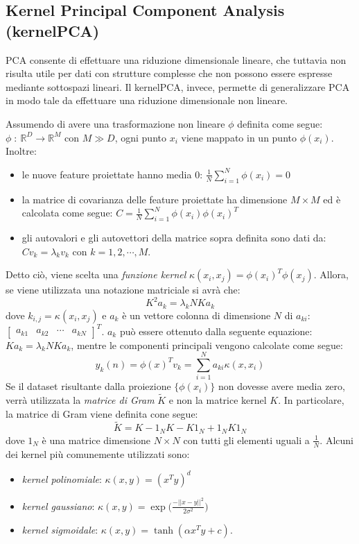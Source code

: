 \documentclass[11pt,a4paper,twocolumn]{article}
\begin{document}
\subsection{Kernel Principal Component Analysis (kernelPCA)}
PCA consente di effettuare una riduzione dimensionale lineare, che tuttavia non risulta utile per dati con strutture complesse che non possono essere espresse mediante sottospazi lineari. Il kernelPCA, invece, permette di generalizzare PCA in modo tale da effettuare una riduzione dimensionale non lineare. \par
Assumendo di avere una trasformazione non lineare $\phi$ definita come segue: $\phi \;: \: \mathbb{R}^D \rightarrow  \mathbb{R}^M $ con $ M \gg D $, ogni punto $ x_i $ viene mappato in un punto $ \phi(x_i) $. Inoltre:
\begin{itemize}
\item le nuove feature proiettate hanno media 0: $ \frac{1}{N}\sum_{i=1}^N{\phi(x_i)}=0$
\item la matrice di covarianza delle feature proiettate ha dimensione $ M \times M $ ed è calcolata come segue: $ C=\frac{1}{N}\sum_{i=1}^N{\phi(x_i)\phi(x_i)^T} $
\item gli autovalori e gli autovettori della matrice sopra definita sono dati da: $ Cv_k=\lambda_k v_k $ con $k=1,2,\cdots,M$.
\end{itemize}
Detto ciò, viene scelta una \emph{funzione kernel} $ \kappa(x_i,x_j)=\phi(x_i)^T\phi(x_j) $. Allora, se viene utilizzata una notazione matriciale si avrà che:
\begin{equation}
\nonumber
K^2a_k=\lambda_kNKa_k
\end{equation}
dove $ k_{i,j}=\kappa(x_i,x_j) $ e $a_k$ è un vettore colonna di dimensione $N$ di $a_{ki}$: $\begin{bmatrix}
a_{k1}& a_{k2} & \cdots & a_{kN}
\end{bmatrix} ^T$.
$a_k$ può essere ottenuto dalla seguente equazione: $ Ka_k=\lambda_kNKa_k$, mentre le componenti principali vengono calcolate come segue:
\begin{equation}
\nonumber
y_k(n)=\phi(x)^Tv_k=\sum_{i=1}^N{a_{ki}}\kappa(x,x_i)
\end{equation}
Se il dataset risultante dalla proiezione $\{\phi(x_i)\}$ non dovesse avere media zero, verrà utilizzata la \emph{matrice di Gram} $\tilde{K}$ e non la matrice kernel $K$. In particolare, la matrice di Gram viene definita cone segue:
\begin{equation}
\nonumber
\tilde{K}=K-1_NK-K1_N+1_NK1_N
\end{equation}
dove $1_N$ è una matrice dimensione $N \times N$ con tutti gli elementi uguali a $ \frac{1}{N}$.
Alcuni dei kernel più comunemente utilizzati sono:
\begin{itemize}
\item \emph{kernel polinomiale}: $ \kappa(x,y)=(x^Ty)^d $
\item \emph{kernel gaussiano}: $ \kappa(x,y)=\exp{\biggl(\frac{- \lvert \lvert {x-y} \lvert \lvert ^2}{2 \sigma^2}\biggr)} $
\item \emph{kernel sigmoidale}: $\kappa(x,y)=\tanh{(\alpha x^Ty+c)}$.
\end{itemize}
\end{document}
